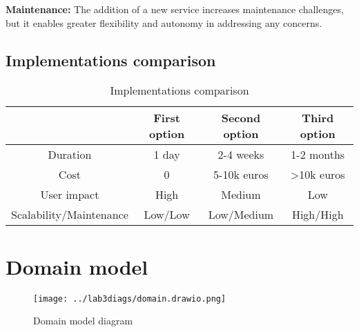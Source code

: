 \documentclass[
    english, %
]{VUMIFPSkursinis}
\begin{document}
\textbf{Maintenance:} The addition of a new service increases maintenance challenges, but it enables greater flexibility and autonomy in addressing any concerns.

\subsection{Implementations comparison}

\begin{table}[H]
    \centering
    \begin{tabular}{|c|c|c|c|}
        \hline
                                & First option & Second option & Third option \\
        \hline
        Duration                & 1 day        & 2-4 weeks     & 1-2 months   \\
        \hline
        Cost                    & 0            & 5-10k euros   & >10k euros   \\
        \hline
        User impact             & High         & Medium        & Low          \\
        \hline
        Scalability/Maintenance & Low/Low      & Low/Medium    & High/High    \\
        \hline
    \end{tabular}
    \caption{Implementations comparison}
    \label{tab:implementations-comparison}
\end{table}

\section{Domain model}

\begin{figure}[ht]
    \centering
    \texttt{[image: ../lab3diags/domain.drawio.png]}
    \caption{Domain model diagram}
    \label{domain-model}
\end{figure}
\end{document}
